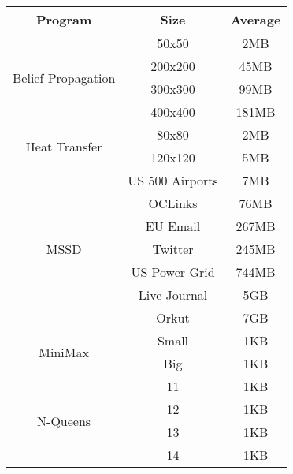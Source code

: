 \begin{tabular}{c | c | c } \hline
	\textbf{Program} & \textbf{Size} & \textbf{Average} \\ \hline \hline
	\multirow{4}{*}{Belief Propagation}  & 50x50 & 2MB\\
		 & 200x200 & 45MB\\
		 & 300x300 & 99MB\\
		 & 400x400 & 181MB\\
	\hline
	\multirow{2}{*}{Heat Transfer}  & 80x80 & 2MB\\
		 & 120x120 & 5MB\\
	\hline
	\multirow{7}{*}{MSSD}  & US 500 Airports & 7MB\\
		 & OCLinks & 76MB\\
		 & EU Email & 267MB\\
		 & Twitter & 245MB\\
		 & US Power Grid & 744MB\\
		 & Live Journal & 5GB\\
		 & Orkut & 7GB\\
	\hline
	\multirow{2}{*}{MiniMax}  & Small & 1KB\\
		 & Big & 1KB\\
	\hline
	\multirow{4}{*}{N-Queens}  & 11 & 1KB\\
		 & 12 & 1KB\\
		 & 13 & 1KB\\
		 & 14 & 1KB\\
	\hline
\end{tabular}

